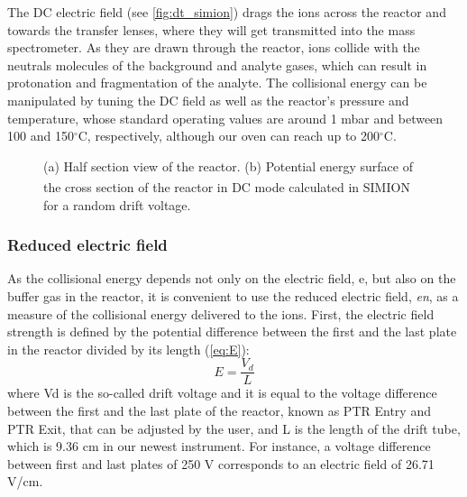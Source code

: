 The DC electric field (see \autoref{fig:dt_simion}) drags the ions across the reactor and towards the transfer lenses, where they will get transmitted into the mass spectrometer. As they are drawn through the reactor, ions collide with the neutrals molecules of the background and analyte gases, which can result in protonation and fragmentation of the analyte. The collisional energy can be manipulated by tuning the DC field as well as the reactor's pressure and temperature, whose standard operating values are around 1 mbar and between 100 and 150$^{\circ}$C, respectively, although our oven can reach up to 200$^{\circ}$C.




\begin{figure}[t]
\centering
{}
\centering
\caption{(a) Half section view of the reactor. (b) Potential energy surface of the cross section of the reactor in DC mode calculated in SIMION\textsuperscript{\textregistered} for a random drift voltage.}
\label{fig:dt_simion}
\end{figure}




\subsubsection{Reduced electric field}
As the collisional energy depends not only on the electric field, \acrshort{e}, but also on the buffer gas in the reactor, it is convenient to use the reduced electric field, \textit{\acrshort{en}}, as a measure of the collisional energy delivered to the ions.
First, the electric field strength  is defined by the potential difference between the first and the last plate in the reactor divided by its length (\autoref{eq:E}):
\begin{equation}
E = \frac{V_d}{L}
\label{eq:E}
\end{equation}
where \acrshort{Vd} is the so-called drift voltage and it is equal to the voltage difference between the first and the last plate of the reactor, known as PTR Entry and PTR Exit,
that can be adjusted by the user, and L is the length of the drift tube, which is 9.36 cm in our newest instrument.
For instance, a voltage difference between first and last plates of 250 V corresponds to an electric field of 26.71 V/cm.

